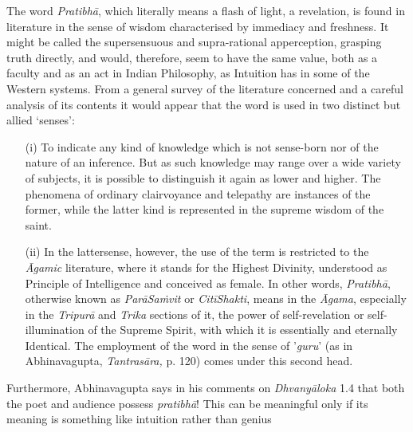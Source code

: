 \begin{myquote}
The word \textsl{Pratibhā}, which literally means a flash of light, a revelation, is found in literature in the sense of wisdom characterised by immediacy and freshness. It might be called the supersensuous and supra-rational apperception, grasping truth directly, and would, therefore, seem to have the same value, both as a faculty and as an act in Indian Philosophy, as Intuition has in some of the Western systems. From a general survey of the literature concerned and a careful analysis of its contents it would appear that the word is used in two distinct but allied ‘senses': 
\begin{itemize}
\item[(i)] To indicate any kind of knowledge which is not sense-born nor of the nature of an inference. But as such knowledge may range over a wide variety of subjects, it is possible to distinguish it again as lower and higher. The phenomena of ordinary clairvoyance and telepathy are instances of the former, while the latter kind is represented in the supreme wisdom of the saint.

\item[(ii)] In the lattersense, however, the use of the term is restricted to the \textsl{Āgamic} literature, where it stands for the Highest Divinity, understood as Principle of Intelligence and conceived as female. In other words, \textsl{Pratibhā}, otherwise known as \textsl{ParāSaṁvit} or \textsl{CitīShakti}, means in the \textsl{Āgama}, especially in the \textsl{Tripurā} and \textsl{Trika} sections of it, the power of self-revelation or self-illumination of the Supreme Spirit, with which it is essentially and eternally Identical. The employment of the word in the sense of '\textsl{guru}' (as in Abhinavagupta, \textsl{Tantrasāra,} p. 120) comes under this second head.
\end{itemize}
\end{myquote}

Furthermore, Abhinavagupta says in his comments on \textsl{Dhvanyāloka} 1.4 that both the poet and audience possess \textsl{pratibhā}! This can be meaningful only if its meaning is something like intuition rather than genius

